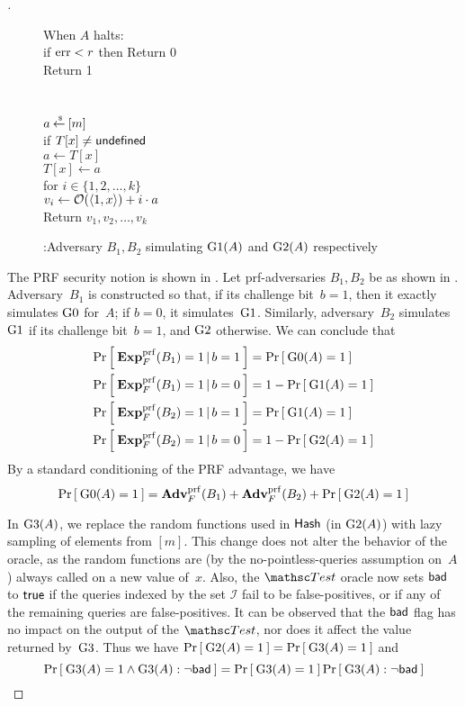 \begin{proof}[]
\begin{figure}
{{When $A$ halts: \\
\nudge if $\mathrm{err}  < r$ then Return 0\\
\nudge Return 1\\\\
%
\\
$a {\:\stackrel{{\scriptscriptstyle \hspace{0.2em}\$}} {\leftarrow}\:} [m]$\\
if $T[x] \neq \mathsf{undefined}$\\
\nudge $a \gets T[x]$\\
$T[x] \gets a$\\
for $i \in \{1,2,\ldots,k\}$\\
\nudge $v_i \gets {\cal O}(\langle 1,x \rangle) + i\cdot a$\\
Return ${v_1,v_2,\ldots,v_k}$
}
}
\caption{:Adversary $B_1, B_2$ simulating $\text{G1}(A)$ and $\text{G2}(A)$ respectively}\label{fig:BGame1}
\end{figure}

The PRF security notion is shown in . Let
prf-adversaries $B_1, B_2$ be as shown in .
Adversary~$B_1$ is constructed so that, if its challenge bit~$b=1$,
then it exactly simulates $\text{G0}$ for~$A$; if $b=0$, it
simulates~$\text{G1}$.  Similarly, adversary~$B_2$ simulates~$\text{G1}$
if its challenge bit~$b=1$, and $\text{G2}$ otherwise.  We can conclude
that 
\begin{align*}
\Prob{\ExpPRF{F}{B_1} = 1\,|\,b=1} &= \Prob{\game{0}(A)=1} \\%
\Prob{\ExpPRF{F}{B_1} = 1\,|\,b=0} &= 1-\Prob{\game{1}(A)=1} \\%
\Prob{\ExpPRF{F}{B_2} = 1\,|\,b=1} &= \Prob{\game{1}(A)=1} \\%
\Prob{\ExpPRF{F}{B_2} = 1\,|\,b=0} &= 1-\Prob{\game{2}(A)=1} \\%
\end{align*}
%
\noindent
By a standard conditioning of the PRF advantage, we have 
\begin{equation*}
\Prob{\game{0}(A)=1} = \AdvPRF{F}{B_1} +\AdvPRF{F}{B_2} + \Prob{\game{2}(A)=1}%
\end{equation*}


In $\text{G3}(A)$, we replace the random functions used in
$\mathsf{Hash}$ (in $\text{G2}(A)$) with lazy sampling of elements from
$[m]$.  This change does not alter the behavior of the oracle, as the
random functions are (by the no-pointless-queries assumption on~$A$) always called on a new
value of~$x$.
%
Also, the $\Test$ oracle now sets $\mathsf{bad}$ to $\mathsf{true}$ if the
queries indexed by the set $\mathcal{I}$ fail to be false-positives,
or if any of the remaining queries are false-positives. It can be
observed that the $\mathsf{bad}$ flag has no impact on the output of the
$\Test$, nor does it affect  the value returned
by~$\text{G3}$. Thus we have $\Pr\left[\: \text{G2}(A)=1 \:\right] =
\Pr\left[\: \text{G3}(A)=1 \:\right]$ and
\[
\Prob{\game{3}(A)=1 \wedge \game{3}(A): \neg\bad} = \Prob{\game{3}(A)=1} \Prob{\game{3}(A) : \neg\bad}%
\]


\end{proof}
